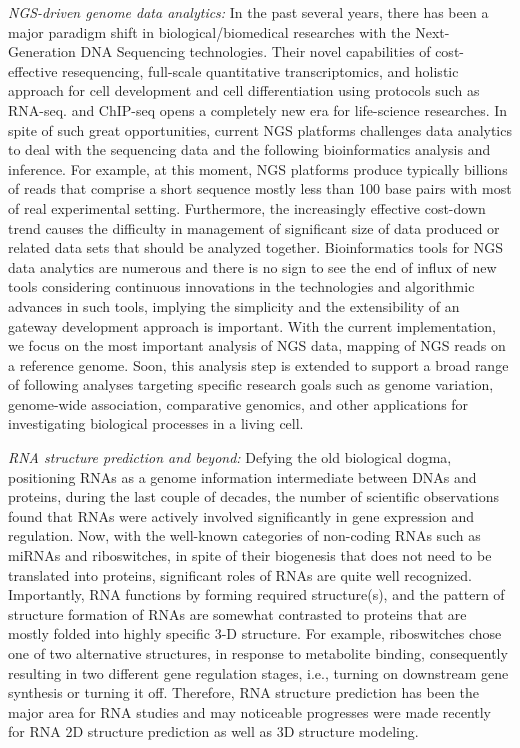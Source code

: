 \documentclass{sig-alternate}
\begin{document}
\textit{NGS-driven genome data analytics:} In the past several years,
there has been a major paradigm shift in biological/biomedical
researches with the Next-Generation DNA Sequencing
technologies\cite{mardis2008-tig,metzker2010}.  Their
novel capabilities of cost-effective resequencing, full-scale
quantitative transcriptomics, and holistic approach for cell
development and cell differentiation using protocols such as
RNA-seq. and ChIP-seq opens a completely new era for life-science
researches\cite{sorek2010}.  In spite of such great
opportunities, current NGS platforms challenges data analytics to deal
with the sequencing data and the following bioinformatics analysis and
inference.  For example, at this moment, NGS platforms produce
typically billions of reads that comprise a short sequence mostly less
than 100 base pairs with most of real experimental
setting\cite{alex2009}.  Furthermore, the increasingly
effective cost-down trend causes the difficulty in management of
significant size of data produced or related data sets that should be
analyzed together.  Bioinformatics tools for NGS data analytics are
numerous and there is no sign to see the end of influx of new tools
considering continuous innovations in the technologies and algorithmic
advances in such tools, implying the simplicity and the extensibility
of an gateway development approach is important.  With the current
implementation, we focus on the most important analysis of NGS data,
mapping of NGS reads on a reference genome.  Soon, this analysis step
is extended to support a broad range of following analyses targeting
specific research goals such as genome variation, genome-wide
association, comparative genomics, and other applications for
investigating biological processes in a living cell.

\textit{RNA structure prediction and beyond:} Defying the old
biological dogma, positioning RNAs as a genome information
intermediate between DNAs and proteins, during the last couple of
decades, the number of scientific observations found that RNAs were
actively involved significantly in gene expression and
regulation\cite{joyce1999,amaral2008}.  Now, with
the well-known categories of non-coding RNAs such as miRNAs and
riboswitches, in spite of their biogenesis that does not need to be
translated into proteins, significant roles of RNAs are quite well
recognized\cite{costa2009,ellington2007}.
Importantly, RNA functions by forming required structure(s), and the
pattern of structure formation of RNAs are somewhat contrasted to
proteins that are mostly folded into highly specific 3-D
structure\cite{roth2009}. For example, riboswitches chose one of two
alternative structures, in response to metabolite binding,
consequently resulting in two different gene regulation stages, i.e.,
turning on downstream gene synthesis or turning it
off\cite{montange2008}.  Therefore, RNA
structure prediction has been the major area for RNA studies and may
noticeable progresses were made recently for RNA 2D structure
prediction as well as 3D structure
modeling\cite{shapiro2007}.
\end{document}
